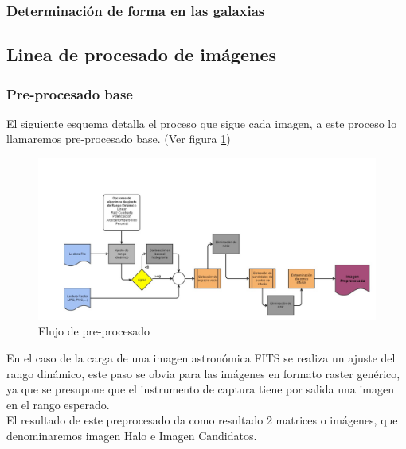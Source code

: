 	\subsubsection{Determinación de forma en las galaxias}

	\subsection{Linea de procesado de imágenes}
	\subsubsection{Pre-procesado base}
	El siguiente esquema detalla el proceso que sigue cada imagen, a este proceso lo llamaremos pre-procesado base. (Ver figura \ref{fig:esquemaPreprocesado})\\
	\begin{figure}[!htb]
		\centering
		\includegraphics[width=1\textwidth]{images/tfg2016pipeline1.jpg}
		\caption{\label{fig:esquemaPreprocesado}Flujo de pre-procesado}
	\end{figure}
	En el caso de la carga de una imagen astronómica FITS se realiza un ajuste del rango dinámico, este paso se obvia para las imágenes en formato raster genérico, ya que se presupone que el instrumento de captura tiene por salida una imagen en el rango esperado.\\
	El resultado de este preprocesado da como resultado 2 matrices o imágenes, que denominaremos imagen Halo e Imagen Candidatos.
